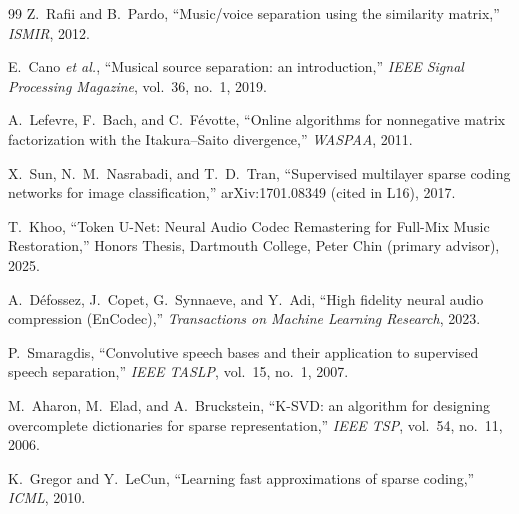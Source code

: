 \documentclass[11pt]{article}
\begin{document}
{\begin{thebibliography}{99}
 Z.\ Rafii and B.\ Pardo,
``Music/voice separation using the similarity matrix,''
\textit{ISMIR}, 2012.

 E.\ Cano \emph{et al.},
``Musical source separation: an introduction,''
\textit{IEEE Signal Processing Magazine}, vol.~36, no.~1, 2019.

 A.\ Lefevre, F.\ Bach, and C.\ F\'evotte,
``Online algorithms for nonnegative matrix factorization with the
Itakura--Saito divergence,'' \textit{WASPAA}, 2011.

 X.\ Sun, N.\ M.\ Nasrabadi, and T.\ D.\ Tran,
``Supervised multilayer sparse coding networks for image
classification,'' arXiv:1701.08349 (cited in L16), 2017.

 T.\ Khoo,
``Token U-Net: Neural Audio Codec Remastering for Full-Mix Music
Restoration,'' Honors Thesis, Dartmouth College, Peter Chin
(primary advisor), 2025.

 A.\ D\'efossez, J.\ Copet, G.\ Synnaeve, and Y.\ Adi,
``High fidelity neural audio compression (EnCodec),''
\textit{Transactions on Machine Learning Research}, 2023.

 P.\ Smaragdis,
``Convolutive speech bases and their application to supervised speech
separation,'' \textit{IEEE TASLP}, vol.\ 15, no.\ 1, 2007.

 M.\ Aharon, M.\ Elad, and A.\ Bruckstein,
``K-SVD: an algorithm for designing overcomplete dictionaries for
sparse representation,'' \textit{IEEE TSP}, vol.\ 54, no.\ 11, 2006.

 K.\ Gregor and Y.\ LeCun,
``Learning fast approximations of sparse coding,''
\textit{ICML}, 2010.
\end{thebibliography}
}
\end{document}
